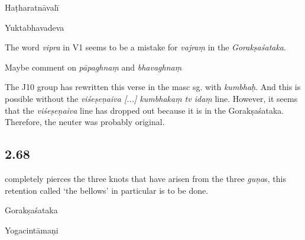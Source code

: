 \begin{ekdosis}
\begin{testimonia}[hp02_067]
Haṭharatnāvalī

\begin{versinnote}
\end{versinnote}

Yuktabhavadeva

\begin{versinnote}
\end{versinnote}
\end{testimonia}

\begin{philcomm}[hp02_067]
The word \emph{vipra} in V1 seems to be a mistake for \emph{vajraṃ} in the \emph{Gorakṣaśataka}.

Maybe comment on \emph{pāpaghnaṃ} and \emph{bhavaghnaṃ}

The J10 group has rewritten this verse in the masc sg. with \emph{kumbhaḥ}. And this is possible without the \emph{viśeṣeṇaiva [...] kumbhakaṃ tv idaṃ} line. However, it seems that the \emph{viśeṣeṇaiva} line has dropped out because it is in the Gorakṣaśataka. Therefore, the neuter was probably original.
\end{philcomm}

\subsection*{2.68}
\begin{translation}[hp02_068]
[and] completely pierces the three knots that have arisen from the three \emph{guṇa}s, this retention called ‘the bellows’ in particular is to be done.
\end{translation}

\begin{sources}[hp02_068]
Gorakṣaśataka

\begin{versinnote}
\end{versinnote}
\end{sources}

\begin{testimonia}[hp02_068]
Yogacintāmaṇi


\end{testimonia}
\end{ekdosis}
